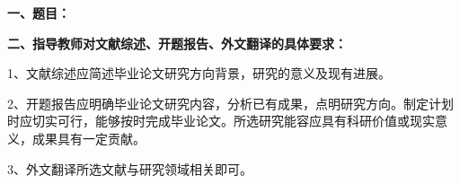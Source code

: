 {
    \setlength{\parindent}{0em}
    \par {\bfseries 一、题目：\Title}
    


    \par {\bfseries 二、指导教师对文献综述、开题报告、外文翻译的具体要求：}
    
    1、文献综述应简述毕业论文研究方向背景，研究的意义及现有进展。

    2、开题报告应明确毕业论文研究内容，分析已有成果，点明研究方向。制定计划时应切实可行，能够按时完成毕业论文。所选研究能容应具有科研价值或现实意义，成果具有一定贡献。

    3、外文翻译所选文献与研究领域相关即可。
    
    
}

\mbox{} \vfill

\signature{指导教师（签名）}
